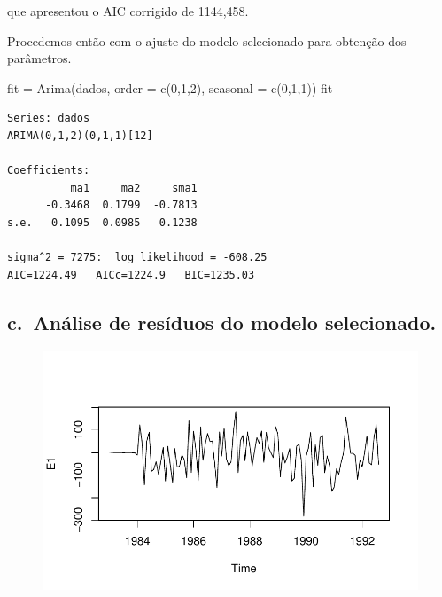 \documentclass[
  letterpaper,
  DIV=11,
  numbers=noendperiod]{scrartcl}
\newenvironment{Shaded}{\begin{snugshade}}{\end{snugshade}}
\newcommand{\AttributeTok}[1]{\textcolor[rgb]{0.40,0.45,0.13}{#1}}
\newcommand{\CommentTok}[1]{\textcolor[rgb]{0.37,0.37,0.37}{#1}}
\newcommand{\DecValTok}[1]{\textcolor[rgb]{0.68,0.00,0.00}{#1}}
\newcommand{\FunctionTok}[1]{\textcolor[rgb]{0.28,0.35,0.67}{#1}}
\newcommand{\NormalTok}[1]{\textcolor[rgb]{0.00,0.23,0.31}{#1}}
\newcommand{\OtherTok}[1]{\textcolor[rgb]{0.00,0.23,0.31}{#1}}
\newcommand{\SpecialCharTok}[1]{\textcolor[rgb]{0.37,0.37,0.37}{#1}}
\begin{document}
que apresentou o AIC corrigido de 1144,458.

Procedemos então com o ajuste do modelo selecionado para obtenção dos
parâmetros.

\begin{Shaded}
\begin{Highlighting}[]
\NormalTok{fit }\OtherTok{=} \FunctionTok{Arima}\NormalTok{(dados, }\AttributeTok{order =} \FunctionTok{c}\NormalTok{(}\DecValTok{0}\NormalTok{,}\DecValTok{1}\NormalTok{,}\DecValTok{2}\NormalTok{), }\AttributeTok{seasonal =} \FunctionTok{c}\NormalTok{(}\DecValTok{0}\NormalTok{,}\DecValTok{1}\NormalTok{,}\DecValTok{1}\NormalTok{))}
\NormalTok{fit}
\end{Highlighting}
\end{Shaded}

\begin{verbatim}
Series: dados 
ARIMA(0,1,2)(0,1,1)[12] 

Coefficients:
          ma1     ma2     sma1
      -0.3468  0.1799  -0.7813
s.e.   0.1095  0.0985   0.1238

sigma^2 = 7275:  log likelihood = -608.25
AIC=1224.49   AICc=1224.9   BIC=1235.03
\end{verbatim}

\hypertarget{c.-anuxe1lise-de-resuxedduos-do-modelo-selecionado.}{%
\subsection{c.~Análise de resíduos do modelo
selecionado.}\label{c.-anuxe1lise-de-resuxedduos-do-modelo-selecionado.}}

\begin{Shaded}
\end{Shaded}

\begin{figure}[H]

{\centering \includegraphics{Trabalhao1_ST_grupo5_2023_05_16_files/figure-pdf/unnamed-chunk-13-1.pdf}

}

\end{figure}
\end{document}
